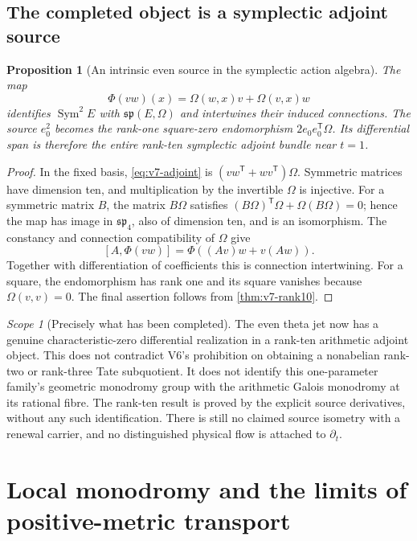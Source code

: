 \documentclass[11pt]{article}
\newtheorem{proposition}[proposition]{Proposition}
\theoremstyle{definition}
\theoremstyle{remark}
\newtheorem{scope}[scope]{Scope}
\begin{document}
\subsection{The completed object is a symplectic adjoint source}
\begin{proposition}[An intrinsic even source in the symplectic action algebra]
\label{prop:v7-adjoint}
The map
\begin{equation}
 \boxed{
 \Phi(vw)(x)=\Omega(w,x)v+\Omega(v,x)w
 }
 \label{eq:v7-adjoint}
\end{equation}
identifies $\operatorname{Sym}^2E$ with $\mathfrak{sp}(E,\Omega)$ and
intertwines their induced connections. The source $e_0^2$ becomes the
rank-one square-zero endomorphism $2e_0e_0^{\mathsf T}\Omega$.
Its differential span is therefore the entire rank-ten symplectic adjoint
bundle near $t=1$.
\end{proposition}
\begin{proof}
In the fixed basis, \eqref{eq:v7-adjoint} is
$(vw^{\mathsf T}+wv^{\mathsf T})\Omega$. Symmetric matrices have dimension
ten, and multiplication by the invertible $\Omega$ is injective. For a
symmetric matrix $B$, the matrix $B\Omega$ satisfies
$(B\Omega)^{\mathsf T}\Omega+\Omega(B\Omega)=0$; hence the map has image
in $\mathfrak{sp}_4$, also of dimension ten, and is an isomorphism.
The constancy and connection compatibility of $\Omega$ give
\[
 [A,\Phi(vw)]=\Phi((Av)w+v(Aw)).
\]
Together with differentiation of coefficients this is connection
intertwining. For a square, the endomorphism has rank one and its square
vanishes because $\Omega(v,v)=0$. The final assertion follows from
\cref{thm:v7-rank10}.
\end{proof}

\begin{scope}[Precisely what has been completed]
The even theta jet now has a genuine characteristic-zero differential
realization in a rank-ten arithmetic adjoint object. This does not contradict
V6's prohibition on obtaining a nonabelian rank-two or rank-three Tate
subquotient. It does not identify this one-parameter family's geometric
monodromy group with the arithmetic Galois monodromy at its rational fibre.
The rank-ten result is proved by the explicit source derivatives, without any
such identification. There is still no claimed source isometry with a renewal
carrier, and no distinguished physical flow is attached to $\partial_t$.
\end{scope}

\section{Local monodromy and the limits of positive-metric transport}
\label{sec:v7-monodromy}
\end{document}
